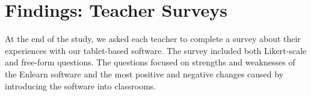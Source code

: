 \documentclass{sigchi}
\begin{document}

\section{Findings: Teacher Surveys}
At the end of the study, we asked each teacher to complete a survey about their experiences with our tablet-based software. The survey included both Likert-scale and free-form questions. The questions focused on strengths and weaknesses of the Enlearn software and the most positive and negative changes caused by introducing the software into classrooms.
\end{document}

